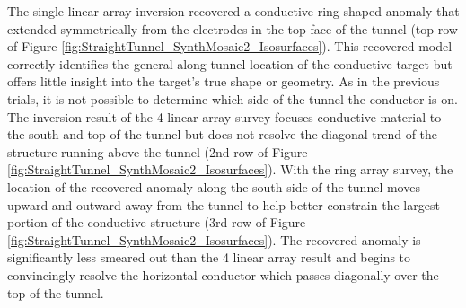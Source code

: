 \documentclass[preprint,authoryear,12pt]{elsarticle}
\begin{document}
The single linear array inversion recovered a conductive ring-shaped anomaly that extended symmetrically from the electrodes in the top face of the tunnel (top row of Figure \ref{fig:StraightTunnel_SynthMosaic2_Isosurfaces}). This recovered model correctly identifies the general along-tunnel location of the conductive target but offers little insight into the target's true shape or geometry. As in the previous trials, it is not possible to determine which side of the tunnel the conductor is on. The inversion result of the 4 linear array survey focuses conductive material to the south and top of the tunnel but does not resolve the diagonal trend of the structure running above the tunnel (2nd row of Figure \ref{fig:StraightTunnel_SynthMosaic2_Isosurfaces}). With the ring array survey, the location of the recovered anomaly along the south side of the tunnel moves upward and outward away from the tunnel to help better constrain the largest portion of the conductive structure (3rd row of Figure \ref{fig:StraightTunnel_SynthMosaic2_Isosurfaces}). The recovered anomaly is significantly less smeared out than the 4 linear array result and begins to convincingly resolve the horizontal conductor which passes diagonally over the top of the tunnel.
\end{document}
